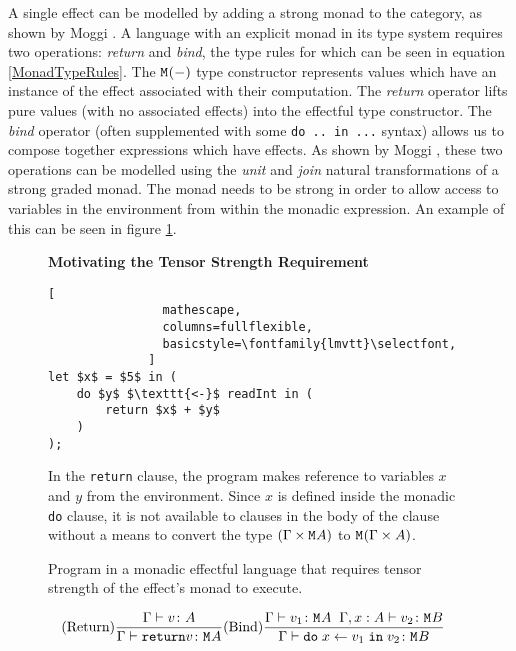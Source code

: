 \documentclass{Report}
\begin{document}
A single effect can be modelled by adding a strong monad to the category, as shown by Moggi \needsRef. A language with an explicit monad in its type system requires two operations: \textit{return} and \textit{bind}, the type rules for which can be seen in equation \ref{MonadTypeRules}. The $\texttt{M}_{}{(-)}$ type constructor represents values which have an instance of the effect associated with their computation. The \textit{return} operator lifts pure values (with no associated effects) into the effectful type constructor. The \textit{bind} operator (often supplemented with some \texttt{do .. in ...} syntax) allows us to compose together expressions which have effects. As shown by Moggi \needsRef, these two operations can be modelled using the \textit{unit} and \textit{join} natural transformations of a strong graded monad. The monad needs to be strong in order to allow access to variables in the environment from within the monadic expression. An example of this can be seen in figure \ref{MonadStrengthRequirement}. 

\begin{figure}
    \begin{framed}
        \textbf{Motivating the Tensor Strength Requirement}
        \begin{framed}
            \begin{lstlisting}[
                mathescape,
                columns=fullflexible,
                basicstyle=\fontfamily{lmvtt}\selectfont,
              ]
let $x$ = $5$ in (
    do $y$ $\texttt{<-}$ readInt in (
        return $x$ + $y$
    ) 
);
            \end{lstlisting}
        \end{framed}
        
In the \texttt{return} clause, the program makes reference to variables $x$ and $y$ from the environment. Since $x$ is defined inside the monadic \texttt{do} clause, it is not available to clauses in the body of the clause without a means to convert the type $(\Gamma \times \texttt{M}_{}{A)}$ to $\texttt{M}_{}{(\Gamma\times A)}$.
\end{framed}
   
\caption{Program in a monadic effectful language that requires tensor strength of the effect's monad to execute.}
\label{MonadStrengthRequirement}
\end{figure}

\begin{eqnarray}\label{MonadTypeRules}
    (\text{Return}) \frac{\Gamma \vdash v \colon A}{\Gamma \vdash \texttt{return} v \colon \texttt{M}_{}{A}} & (\text{Bind}) \frac{\Gamma \vdash v_1 \colon \texttt{M}_{}{A} \;\; \Gamma, x: A \vdash v_2 \colon \texttt{M}_{}{B}}{\Gamma \vdash \texttt{do}\; x \leftarrow v_1 \;\texttt{in}\; v_2 \colon \texttt{M}_{}{B}}
\end{eqnarray}
\end{document}
